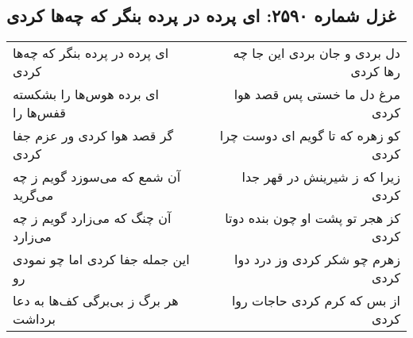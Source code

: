 \begin{center}
\section*{غزل شماره ۲۵۹۰: ای پرده در پرده بنگر که چه‌ها کردی}
\label{sec:2590}
\begin{longtable}{l p{0.5cm} r}
ای پرده در پرده بنگر که چه‌ها کردی
&&
دل بردی و جان بردی این جا چه رها کردی
\\
ای برده هوس‌ها را بشکسته قفس‌ها را
&&
مرغ دل ما خستی پس قصد هوا کردی
\\
گر قصد هوا کردی ور عزم جفا کردی
&&
کو زهره که تا گویم ای دوست چرا کردی
\\
آن شمع که می‌سوزد گویم ز چه می‌گرید
&&
زیرا که ز شیرینش در قهر جدا کردی
\\
آن چنگ که می‌زارد گویم ز چه می‌زارد
&&
کز هجر تو پشت او چون بنده دوتا کردی
\\
این جمله جفا کردی اما چو نمودی رو
&&
زهرم چو شکر کردی وز درد دوا کردی
\\
هر برگ ز بی‌برگی کف‌ها به دعا برداشت
&&
از بس که کرم کردی حاجات روا کردی
\\
\end{longtable}
\end{center}
